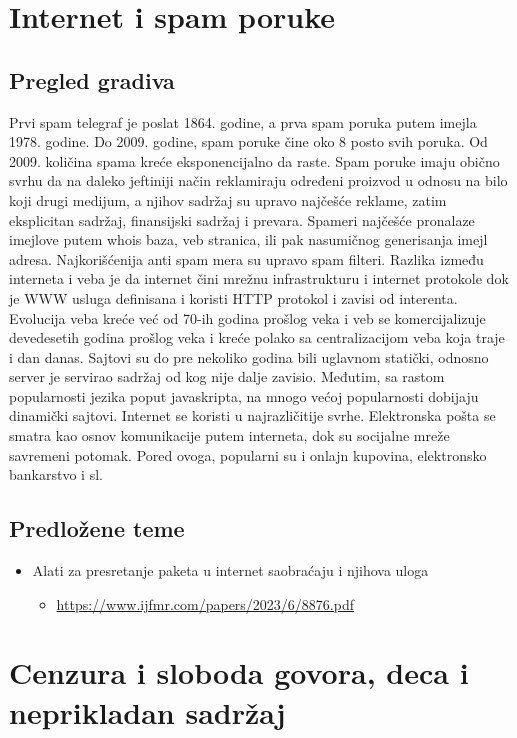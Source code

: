 \documentclass[a4paper,12pt]{article}
\begin{document}
\section{Internet i spam poruke}
\subsection{Pregled gradiva}
Prvi spam telegraf je poslat 1864. godine, a prva spam poruka putem imejla 1978. godine. Do 2009. godine, spam poruke čine oko 8 posto svih poruka. Od 2009. količina spama kreće eksponencijalno da raste. Spam poruke imaju obično svrhu da na daleko jeftiniji način reklamiraju određeni proizvod u odnosu na bilo koji drugi medijum, a njihov sadržaj su upravo najčešće reklame, zatim eksplicitan sadržaj, finansijski sadržaj i prevara. Spameri najčešće pronalaze imejlove putem whois baza, veb stranica, ili pak nasumičnog generisanja imejl adresa. Najkorišćenija anti spam mera su upravo spam filteri.
Razlika između interneta i veba je da internet čini mrežnu infrastrukturu i internet protokole dok je WWW usluga definisana i koristi HTTP protokol i zavisi od interenta. Evolucija veba kreće već od 70-ih godina prošlog veka i veb se komercijalizuje devedesetih godina prošlog veka i kreće polako sa centralizacijom veba koja traje i dan danas. Sajtovi su do pre nekoliko godina bili uglavnom statički, odnosno server je servirao sadržaj od kog nije dalje zavisio. Međutim, sa rastom popularnosti jezika poput javaskripta, na mnogo većoj popularnosti dobijaju dinamički sajtovi.
Internet se koristi u najrazličitije svrhe. Elektronska pošta se smatra kao osnov komunikacije putem interneta, dok su socijalne mreže savremeni potomak. Pored ovoga, popularni su i onlajn kupovina, elektronsko bankarstvo i sl.
\subsection{Predložene teme}
\begin{itemize}
    \item Alati za presretanje paketa u internet saobraćaju i njihova uloga
    \begin{itemize}
        \item \url{https://www.ijfmr.com/papers/2023/6/8876.pdf}
    \end{itemize}
\end{itemize}
\section{Cenzura i sloboda govora, deca i neprikladan sadržaj}
\end{document}
